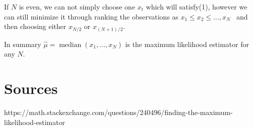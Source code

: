 \documentclass{article}
\newcommand{\tmop}[1]{\ensuremath{\operatorname{#1}}}
\begin{document}
If $N$ is even, we can not simply choose one $x_t$ which will satisfy(1),
however we can still minimize it through ranking the observations as $x_1
\leqslant x_2 \leqslant \ldots, x_N$ \ and then choosing either $x_{N / 2}$ or
$x_{(N + 1) / 2}$.

In summary $\hat{\mu} = \tmop{median} (x_1, \ldots, x_N)$ is the maximum
likelihood estimator for any $N$.

\section*{Sources}

https://math.stackexchange.com/questions/240496/finding-the-maximum-likelihood-estimator

\
\end{document}

